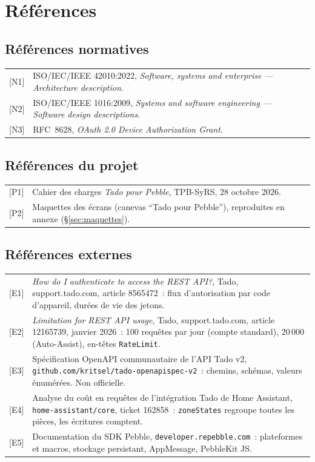 \section{Références}

\subsection*{Références normatives}

\begin{longtable}{@{}p{22mm}p{138mm}@{}}
  {[N1]} & ISO/IEC/IEEE 42010:2022, \textit{Software, systems and enterprise --- Architecture description}. \\
  {[N2]} & ISO/IEC/IEEE 1016:2009, \textit{Systems and software engineering --- Software design descriptions}. \\
  {[N3]} & RFC~8628, \textit{OAuth 2.0 Device Authorization Grant}. \\
\end{longtable}

\subsection*{Références du projet}

\begin{longtable}{@{}p{22mm}p{138mm}@{}}
  {[P1]} & Cahier des charges \textit{Tado pour Pebble}, TPB-SyRS, 28 octobre 2026. \\
  {[P2]} & Maquettes des écrans (canevas \enquote{Tado pour Pebble}), reproduites en annexe (§\ref{sec:maquettes}). \\
\end{longtable}

\subsection*{Références externes}

\begin{longtable}{@{}p{22mm}p{138mm}@{}}
  {[E1]} & \textit{How do I authenticate to access the REST API?}, Tado, support.tado.com, article 8565472~: flux d'autorisation par code d'appareil, durées de vie des jetons. \\
  {[E2]} & \textit{Limitation for REST API usage}, Tado, support.tado.com, article 12165739, janvier 2026~: 100 requêtes par jour (compte standard), 20\,000 (Auto-Assist), en-têtes \texttt{RateLimit}. \\
  {[E3]} & Spécification OpenAPI communautaire de l'API Tado v2, \texttt{github.com/kritsel/tado-openapispec-v2}~: chemins, schémas, valeurs énumérées. Non officielle. \\
  {[E4]} & Analyse du coût en requêtes de l'intégration Tado de Home Assistant, \texttt{home-assistant/core}, ticket 162858~: \texttt{zoneStates} regroupe toutes les pièces, les écritures comptent. \\
  {[E5]} & Documentation du SDK Pebble, \texttt{developer.repebble.com}~: plateformes et macros, stockage persistant, AppMessage, PebbleKit JS. \\
\end{longtable}


